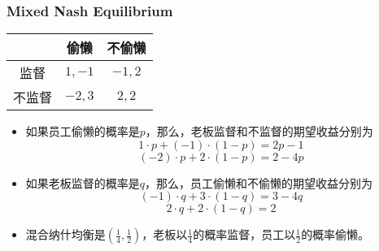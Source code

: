 \documentclass[UTF8,11pt,colorlinks,compress,openany]{beamer}%
\begin{document}
\begin{frame}\frametitle{Mixed Nash Equilibrium}
\begin{table}
\begin{tabu}{c|c|c}
\hline
 & 偷懒 & 不偷懒 \\
\hline
监督 & $1,-1$ & $-1,2$ \\
不监督 & $-2,3$ & $2,2$ \\
\hline
\end{tabu}
\end{table}
\begin{itemize}
	\item 如果员工偷懒的概率是$p$，那么，老板监督和不监督的期望收益分别为
	\[1\cdot p+(-1)\cdot(1-p)=2p-1\]
	\[(-2)\cdot p+2\cdot(1-p)=2-4p\]
	\item 如果老板监督的概率是$q$，那么，员工偷懒和不偷懒的期望收益分别为
	\[(-1)\cdot q+3\cdot(1-q)=3-4q\]
	\[2\cdot q+2\cdot(1-q)=2\]
	\item 混合纳什均衡是$(\frac{1}{4},\frac{1}{2})$，老板以$\frac{1}{4}$的概率监督，员工以$\frac{1}{2}$的概率偷懒。
\end{itemize}
\end{frame}
\end{document}
